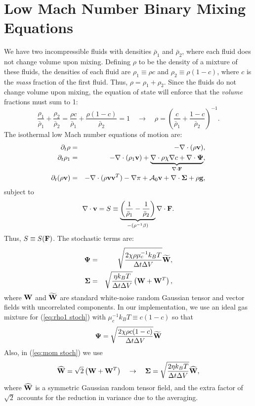 \documentclass[final]{siamltex}
\def\Fb {{\bf F}}
\def\gb {{\bf g}}
\def\vb {{\bf v}}
\def\Wb {{\bf W}}
\def\Psib   {\boldsymbol{\Psi}}
\def\Sigmab {\boldsymbol{\Sigma}}
\begin{document}
\section{Low Mach Number Binary Mixing Equations}
We have two incompressible fluids with densities $\bar\rho_1$ and $\bar\rho_2$, where 
each fluid does not change volume upon mixing.  Defining $\rho$ to be the density of
a mixture of these fluids, the densities of each fluid are $\rho_1 \equiv \rho c$ and 
$\rho_2 \equiv \rho(1-c)$, where $c$ is the {\it mass} fraction of the first fluid.  
Thus, $\rho = \rho_1 + \rho_2$.  Since the fluids do not change volume upon mixing, 
the equation of state will enforce that the {\it volume} fractions must sum to 1:
\begin{equation}
\frac{\rho_1}{\bar\rho_1} + \frac{\rho_2}{\bar\rho_2} =
\frac{\rho c}{\bar\rho_1} + \frac{\rho(1-c)}{\bar\rho_2} = 1 
\quad \rightarrow \quad
\rho = \left(\frac{c}{\bar\rho_1} + \frac{1-c}{\bar\rho_2}\right)^{-1}.
\end{equation}
The isothermal low Mach number equations of motion are:
\begin{eqnarray}
\partial_t\rho &=& -\nabla\cdot(\rho\vb),\\
\partial_t\rho_1 &=& -\nabla\cdot(\rho_1\vb) + \underbrace{\nabla\cdot\rho\chi\nabla c + \nabla\cdot\Psib}_{\nabla\cdot\Fb},\\
\partial_t(\rho\vb) &=& -\nabla\cdot(\rho\vb\vb^T) - \nabla\pi + \mathcal{A}_0\vb + \nabla\cdot\Sigmab + \rho\gb,
\end{eqnarray}
subject to
\begin{equation}
\nabla\cdot\vb = S \equiv \underbrace{\left(\frac{1}{\bar\rho_1}-\frac{1}{\bar\rho_2}\right)}_{-(\rho^{-1}\beta)}\nabla\cdot\Fb.
\end{equation}
Thus, $S \equiv S(\Fb)$.  The stochastic terms are:
\begin{eqnarray}
\Psib &=& \sqrt{\frac{2\chi\rho\mu_c^{-1}k_BT}{\Delta t\Delta V}}\widetilde\Wb,\label{eq:rho1 stoch}\\
\Sigmab &=& \sqrt{\frac{\eta k_B T}{\Delta t\Delta V}}\left(\Wb + \Wb^T\right),\label{eq:mom stoch}
\end{eqnarray}
where $\Wb$ and $\widetilde\Wb$ are standard white-noise random Gaussian tensor
and vector fields with uncorrelated components.  In our implementation, 
we use an ideal gas mixture for (\ref{eq:rho1 stoch}) with $\mu_c^{-1}k_BT \equiv c(1-c)$ so that
\begin{equation}
\Psib = \sqrt{\frac{2\chi\rho c(1-c)}{\Delta t\Delta V}}\widetilde\Wb
\end{equation}
Also, in (\ref{eq:mom stoch}) we use
\begin{equation}
\widehat\Wb = \sqrt{2}\left(\Wb + \Wb^T\right) \quad \rightarrow \quad
\Sigmab = \sqrt{\frac{2\eta k_B T}{\Delta t\Delta V}}\widehat\Wb,
\end{equation}
where $\widehat\Wb$ is a symmetric Gaussian random tensor field, and the
extra factor of $\sqrt{2}$ accounts for the reduction in variance due to the averaging.\\
\end{document}
